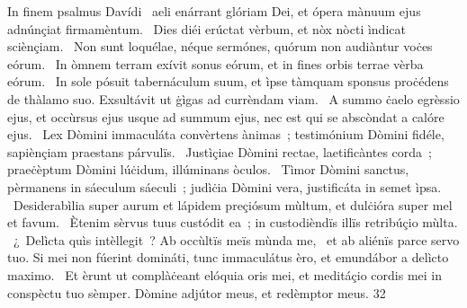 { In finem psalmus Davídi}
{%
~aeli enárrant glóriam Dei, et ópera mànuum ejus adnúnçiat firmamèntum. 
~Dies diéi erúctat vèrbum, et nòx nòcti ìndicat sciènçiam. 
~Non sunt loquélae, néque sermónes, quórum non audiàntur voċes eórum. 
~In òmnem terram exívit sonus eórum, et in fines orbis terrae vèrba eórum. 
~In sole pósuit tabernáculum suum, et ìpse tàmquam sponsus proċédens de thàlamo suo. Exsultávit ut ġìgas ad currèndam viam. 
~A summo ċaelo egrèssio ejus, et occùrsus ejus usque ad summum ejus, nec est qui se abscòndat a calóre ejus. 
~Lex Dòmini immaculáta convèrtens ànimas~; testimónium Dòmini fidéle, sapiènçiam praestans párvulïs. 
~Justìçiae Dòmini rectae, laetificàntes corda~; praeċèptum Dòmini lúċidum, illúminans òculos. 
~Tìmor Dòmini sanctus, pèrmanens in sáeculum sáeculi~; judìċia Dòmini vera, justificáta in semet ìpsa. 
~Desiderabìlia super aurum et lápidem preçiósum mùltum, et dulċióra super mel et favum. 
~Ètenim sèrvus tuus custódit ea~; in custodièndïs illïs retribúçio mùlta. 
~¿~Delìcta quìs intèllegit~? Ab occùltïs meïs mùnda me, 
~et ab aliénïs parce servo tuo. Si mei non fúerint domináti, tunc immaculátus èro, et emundábor a delìcto maximo. 
~Et èrunt ut complàċeant elóquia oris mei, et meditáçio cordis mei in conspèctu tuo sèmper. Dòmine adjútor meus, et redèmptor meus. 
}
{3}{2}
